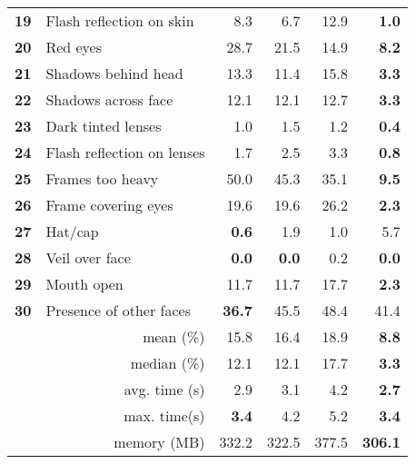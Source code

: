 \begin{table}[tb]
{\begin{tabular}{clrrrr}
\textbf{19} & Flash reflection on skin          & 8.3           & 6.7          & 12.9  & \textbf{1.0}  \\
\textbf{20} & Red eyes                          & 28.7          & 21.5         & 14.9  & \textbf{8.2}  \\
\textbf{21} & Shadows behind head               & 13.3          & 11.4         & 15.8  & \textbf{3.3}  \\
\textbf{22} & Shadows across face               & 12.1          & 12.1         & 12.7  & \textbf{3.3}  \\
\textbf{23} & Dark tinted lenses                & 1.0           & 1.5          & 1.2   & \textbf{0.4}  \\
\textbf{24} & Flash reflection on lenses        & 1.7           & 2.5          & 3.3   & \textbf{0.8}  \\
\textbf{25} & Frames too heavy                  & 50.0          & 45.3         & 35.1  & \textbf{9.5}  \\
\textbf{26} & Frame covering eyes               & 19.6          & 19.6         & 26.2  & \textbf{2.3}  \\
\textbf{27} & Hat/cap                           & \textbf{0.6}  & 1.9          & 1.0   & 5.7           \\
\textbf{28} & Veil over face                    & \textbf{0.0}  & \textbf{0.0} & 0.2   & \textbf{0.0}  \\
\textbf{29} & Mouth open                        & 11.7          & 11.7         & 17.7  & \textbf{2.3}  \\
\textbf{30} & Presence of other faces           & \textbf{36.7} & 45.5         & 48.4  & 41.4          \\ \hline
            & \multicolumn{1}{r}{mean (\%)}      & 15.8          & 16.4         & 18.9  & \textbf{8.8}  \\
            & \multicolumn{1}{r}{median (\%)}    & 12.1          & 12.1         & 17.7  & \textbf{3.3}  \\
            & \multicolumn{1}{r}{avg. time (s)} & 2.9           & 3.1          & 4.2   & \textbf{2.7}  \\
            & \multicolumn{1}{r}{max. time(s)}  & \textbf{3.4}  & 4.2          & 5.2   & \textbf{3.4}  \\
            & \multicolumn{1}{r}{memory (MB)}   & 332.2         & 322.5        & 377.5 & \textbf{306.1} 
\end{tabular}%
}
\end{table}